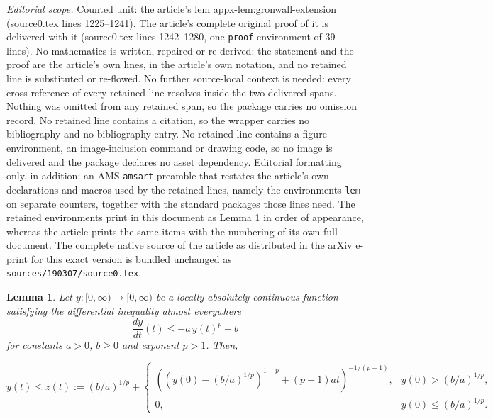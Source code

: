 \documentclass[10pt,a4paper]{amsart}
\newtheorem{lem}{Lemma}
\begin{document}
\noindent\textit{Editorial scope.} Counted unit: the article's lem appx-lem:gronwall-extension (source0.tex lines 1225--1241). The article's complete original proof of it is delivered with it (source0.tex lines 1242--1280, one \texttt{proof} environment of 39 lines). No mathematics is written, repaired or re-derived: the statement and the proof are the article's own lines, in the article's own notation, and no retained line is substituted or re-flowed.  No further source-local context is needed: every cross-reference of every retained line resolves inside the two delivered spans.  Nothing was omitted from any retained span, so the package carries no omission record.  No retained line contains a citation, so the wrapper carries no bibliography and no bibliography entry.  No retained line contains a figure environment, an image-inclusion command or drawing code, so no image is delivered and the package declares no asset dependency.  Editorial formatting only, in addition: an AMS \texttt{amsart} preamble that restates the article's own declarations and macros used by the retained lines, namely the environments \texttt{lem} on separate counters, together with the standard packages those lines need.  The retained environments print in this document as Lemma 1 in order of appearance, whereas the article prints the same items with the numbering of its own full document.  The complete native source of the article as distributed in the arXiv e-print for this exact version is bundled unchanged as \texttt{sources/190307/source0.tex}.
    \begin{lem}\label{appx-lem:gronwall-extension}
        Let $y : [0, \infty) \to [0, \infty)$ be a locally absolutely continuous function satisfying the differential inequality almost everywhere
        \begin{equation*}
            \frac{dy}{dt}(t) \le -a\, y(t)^p + b
        \end{equation*}
        for constants $a>0$, $b\geq0$ and exponent $p > 1$. Then,
        
        \begin{equation*}
            y(t)\leq z(t):=(b/a)^{1/p}+
            \begin{cases}
                ((y(0)-(b/a)^{1/p})^{1-p}+(p-1)at)^{-1/(p-1)},&y(0)>(b/a)^{1/p},\\
                0,&y(0)\leq(b/a)^{1/p}.
            \end{cases}
        \end{equation*}
        

    \end{lem}
\end{document}
